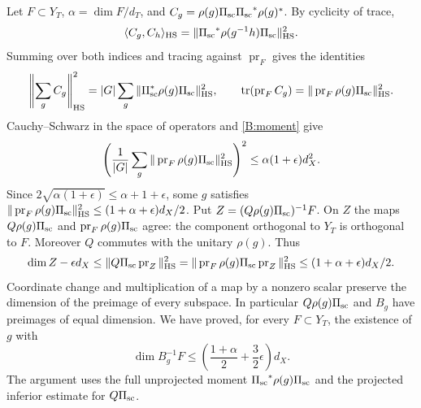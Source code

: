 Let \(F\subset Y_T\), \(\alpha=\dim F/d_T\), and
\(C_g=\rho(g){\Pi_{\rm sc}}{\Pi_{\rm sc}}^*\rho(g)^*\). By cyclicity of trace,
\[
 \langle C_g,C_h\rangle_{\rm HS}
 =\|{\Pi_{\rm sc}}^*\rho(g^{-1}h){\Pi_{\rm sc}}\|_{\rm HS}^2 .
\]
Summing over both indices and tracing against \(\operatorname{pr}_F\)
gives the identities
\[
 \left\|\sum_g C_g\right\|_{\rm HS}^2
 = |G|\sum_g\|\Pi_{\rm sc}^*\rho(g)\Pi_{\rm sc}\|_{\rm HS}^2,
 \qquad
 \operatorname{tr}(\operatorname{pr}_F C_g)
 = \|\operatorname{pr}_F\rho(g)\Pi_{\rm sc}\|_{\rm HS}^2.
\]
Cauchy--Schwarz in the space of operators and \eqref{B:moment} give
\[
 \left(\frac1{|G|}\sum_g
     \|\operatorname{pr}_F\rho(g){\Pi_{\rm sc}}\|_{\rm HS}^2\right)^2
 \le\alpha(1+\epsilon)d_X^2 .
\]
Since \(2\sqrt{\alpha(1+\epsilon)}\le\alpha+1+\epsilon\),
some \(g\) satisfies
\(\|\operatorname{pr}_F\rho(g){\Pi_{\rm sc}}\|_{\rm HS}^2
\le(1+\alpha+\epsilon)d_X/2\).
Put \(Z=(Q\rho(g){\Pi_{\rm sc}})^{-1}F\).
On \(Z\) the maps \(Q\rho(g){\Pi_{\rm sc}}\) and \(\operatorname{pr}_F\rho(g){\Pi_{\rm sc}}\)
agree: the component orthogonal to \(Y_T\) is orthogonal to \(F\).
Moreover \(Q\) commutes with the unitary \(\rho(g)\).
Thus
\[
 \dim Z-\epsilon d_X
 \le\|Q{\Pi_{\rm sc}}\operatorname{pr}_Z\|_{\rm HS}^2
 =\|\operatorname{pr}_F\rho(g){\Pi_{\rm sc}}\operatorname{pr}_Z\|_{\rm HS}^2
 \le(1+\alpha+\epsilon)d_X/2.
\]
Coordinate change and multiplication of a map by a nonzero scalar
preserve the dimension of the preimage of every subspace. In particular
\(Q\rho(g){\Pi_{\rm sc}}\) and \(B_g\) have preimages of equal dimension.
We have proved, for every \(F\subset Y_T\), the existence of \(g\) with
\begin{equation}
\label{B:spread}
 \dim B_g^{-1}F\le\left(\frac{1+\alpha}{2}
                  +\frac32\epsilon\right)d_X .
\end{equation}
The argument uses the full unprojected moment
\({\Pi_{\rm sc}}^*\rho(g){\Pi_{\rm sc}}\) and the projected inferior estimate for \(Q{\Pi_{\rm sc}}\).

